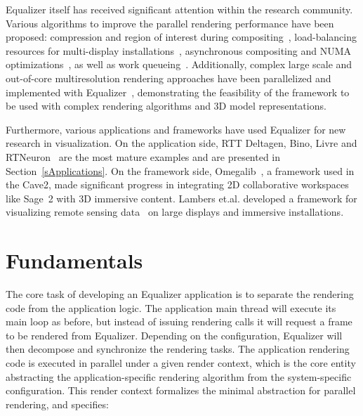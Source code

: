 \documentclass[10pt,journal,compsoc]{IEEEtran}
\newcommand{\sref}[1]{Section~\ref{#1}}
\providecommand{\DIFaddtex}[1]{{\protect\color{blue} \sf #1}} %
\providecommand{\DIFaddbegin}{} %
\providecommand{\DIFadd}[1]{\texorpdfstring{\DIFaddtex{#1}}{#1}} %
\newcommand{\DIFaddincludegraphics}[2][]{{\color{blue}\fbox{\DIFOincludegraphics[#1]{#2}}}} %
\DeclareRobustCommand{\DIFaddbegin}{\DIFOaddbegin \let\includegraphics\DIFaddincludegraphics} %
\begin{document}
\textsf{Equalizer} itself has received significant attention within the research
community. Various algorithms to improve the parallel rendering performance have
been proposed: compression and region of interest during
compositing~\cite{MEP:10}, load-balancing resources for multi-display
installations~\cite{EEP:11}, asynchronous compositing and NUMA
optimizations~\cite{EBAHMP:12}, as well as work queueing~\cite{SPEP:16}.
Additionally, complex large scale and out-of-core multiresolution
rendering approaches have been parallelized and implemented with
Equalizer~\cite{GMBP:10, GEMPG:13}, demonstrating the feasibility of
the framework to be used with complex rendering algorithms and 3D model
representations.

Furthermore, various applications and frameworks have used \textsf{Equalizer}
for new research in visualization. On the application side, \textsf{RTT
Deltagen}, \textsf{Bino}, \textsf{Livre} and \textsf{RTNeuron}~\cite{HBBES:13}
are the most mature examples and are presented in \sref{sApplications}. On the
framework side, \textsf{Omegalib}~\cite{Omegalib}, a framework used in the
Cave2, made significant progress in integrating 2D collaborative workspaces like
\textsf{Sage~2} with 3D immersive content. Lambers et.al. developed a framework
for visualizing remote sensing data~\cite{LK:09} on large displays and immersive
installations.

\DIFaddbegin \section{\DIFadd{Fundamentals}}

\DIFadd{The core task of developing an Equalizer application is to separate the
rendering code from the application logic. The application main thread will
execute its main loop as before, but instead of issuing rendering calls it will
request a frame to be rendered from Equalizer. Depending on the configuration,
Equalizer will then decompose and synchronize the rendering tasks. The
application rendering code is executed in parallel under a given render
context, which is the core entity abstracting the application-specific
rendering algorithm from the system-specific configuration. This render context
formalizes the minimal abstraction for parallel rendering, and specifies:
}
\end{document}

